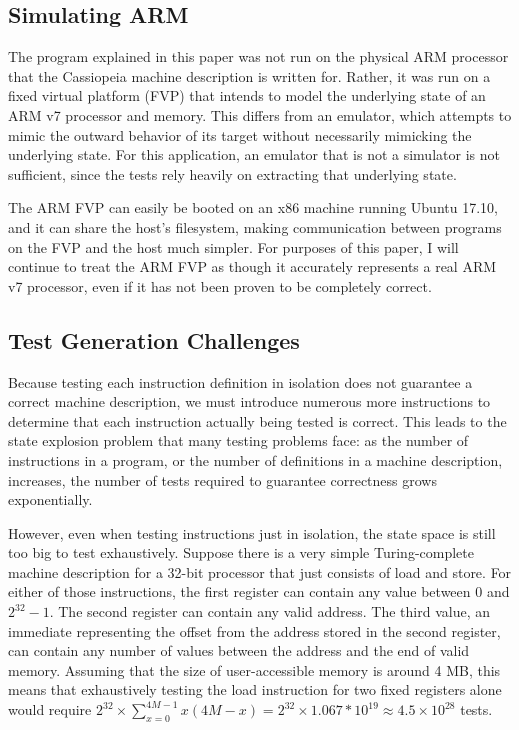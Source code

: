 \documentclass[letterpaper,12pt]{article}
\begin{document}
\subsection{Simulating ARM}

The program explained in this paper was not run on the physical ARM processor that the Cassiopeia machine description is written for. Rather, it was run on a fixed virtual platform (FVP) that intends to model the underlying state of an ARM v7 processor and memory\cite{FVP}. This differs from an emulator, which attempts to mimic the outward behavior of its target without necessarily mimicking the underlying state. For this application, an emulator that is not a simulator is not sufficient, since the tests rely heavily on extracting that underlying state.

The ARM FVP can easily be booted on an x86 machine running Ubuntu 17.10, and it can share the host's filesystem, making communication between programs on the FVP and the host much simpler. For purposes of this paper, I will continue to treat the ARM FVP as though it accurately represents a real ARM v7 processor, even if it has not been proven to be completely correct.

\subsection{Test Generation Challenges}

Because testing each instruction definition in isolation does not guarantee a correct machine description, we must introduce numerous more instructions to determine that each instruction actually being tested is correct. This leads to the state explosion problem that many testing problems face: as the number of instructions in a program, or the number of definitions in a machine description, increases, the number of tests required to guarantee correctness grows exponentially\cite{Klee}.

However, even when testing instructions just in isolation, the state space is still too big to test exhaustively. Suppose there is a very simple Turing-complete machine description for a 32-bit processor that just consists of load and store. For either of those instructions, the first register can contain any value between 0 and $2^{32} - 1$. The second register can contain any valid address. The third value, an immediate representing the offset from the address stored in the second register, can contain any number of values between the address and the end of valid memory\cite{ARM}. Assuming that the size of user-accessible memory is around 4 MB, this means that exhaustively testing the load instruction for two fixed registers alone would require $2^{32} \times \sum_{x=0}^{4M-1}x(4M-x) = 2^{32} \times 1.067*10^{19} \approx 4.5 \times 10^{28}$ tests.
\end{document}
